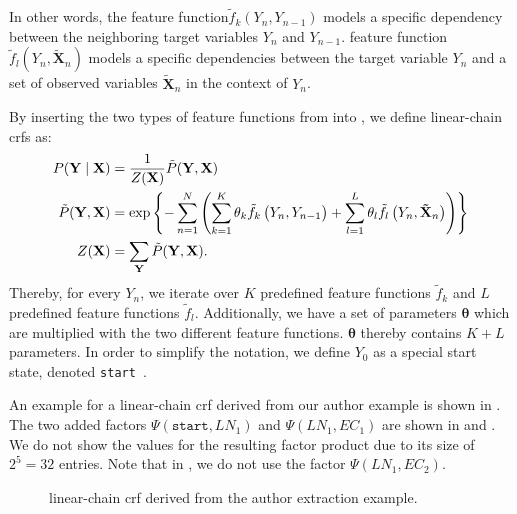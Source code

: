 In other words, the \gls{feature function}$ \tilde{f}_k(Y_n,Y_{n-1})$ models a specific dependency between the neighboring \glspl{target variable} $Y_n$ and $Y_{n-1}$. \Gls{feature function} $\tilde{f}_l(Y_n,\mathbf{\tilde{X}}_n)$ models a specific dependencies between the \gls{target variable} $Y_n$ and a set of \glspl{observed variable} $\mathbf{\tilde{X}}_n$ in the context of $Y_n$.

By inserting the two types of \glspl{feature function} from  into , we define \glspl{linear-chain crf} as:
\begin{equation}
  \label{equ:linear-chain-crf-log-linear}
  \begin{split}
    P(\mathbf{Y}\mid\mathbf{X}) & = \frac{1}{Z(\mathbf{X})}\tilde{P}(\mathbf{Y},\mathbf{X})  \\
    \tilde{P}(\mathbf{Y},\mathbf{X}) & = \exp\left\{ -\sum_{n=1}^N \left(\sum_{k=1}^K\theta_k \tilde{f}_k\left(\vphantom{\tilde{X}}Y_n,Y_{n-1}\right)+\sum_{l=1}^L\theta_l \tilde{f}_l\left(Y_n,\mathbf{\tilde{X}}_n\right)\right) \right\} \\
    Z(\mathbf{X}) & = \sum_{\mathbf{Y}}\tilde{P}(\mathbf{Y},\mathbf{X}).
  \end{split}
\end{equation}
Thereby, for every $Y_n$, we iterate over $K$ predefined \glspl{feature function} $\tilde{f}_k$ and $L$ predefined \glspl{feature function} $\tilde{f}_l$.
Additionally, we have a set of parameters $\bm{\theta}$ which are multiplied with the two different \glspl{feature function}.
$\bm{\theta}$ thereby contains $K+L$ parameters.
In order to simplify the notation, we define $Y_0$ as a special start state, denoted \texttt{start}~\citep{lafferty2001conditional}.

An example for a  \gls{linear-chain crf} derived from our author example is shown in .
The two added \glspl{factor} $\Psi(\texttt{start},LN_1)$ and $\Psi(LN_1,EC_1)$ are shown in  and .
We do not show the values for the resulting \gls{factor product} due to its size of $2^5{=}32$ entries.
Note that in , we do not use the \gls{factor} $\Psi(LN_1,EC_2)$.

\begin{figure}[t]
\centering

\caption{%
  \Gls{linear-chain crf} derived from the author extraction example.
}
\label{fig:example-linear-chain-crf}
\end{figure}

